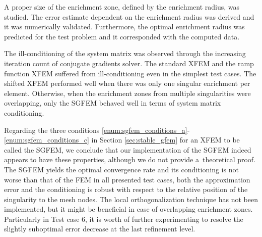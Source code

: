 A proper size of the enrichment zone, defined by the enrichment radius, was studied. The error estimate dependent
on the enrichment radius was derived and it was numerically validated. Furthermore, the optimal enrichment radius was predicted 
for the test problem and it corresponded with the computed data.

The ill-conditioning of the system matrix was observed through the increasing iteration count of conjugate gradients solver.
The standard XFEM and the ramp function XFEM suffered from ill-conditioning even in the simplest test cases.
The shifted XFEM performed well when there was only one singular enrichment per element. Otherwise, when the enrichment
zones from multiple singularities were overlapping, only the SGFEM behaved well in terms of system matrix conditioning.


Regarding the three conditions \ref{enum:sgfem_conditions_a}-\ref{enum:sgfem_conditions_c} in Section \ref{sec:stable_gfem}
for an XFEM to be called the SGFEM, we conclude that our implementation of the SGFEM indeed appears to have these properties,
although we do not provide a~theoretical proof. The SGFEM yields the optimal convergence rate and its conditioning is not worse
than that of the FEM in all presented test cases, both the approximation error and the conditioning is robust with respect to the relative position
of the singularity to the mesh nodes.
The local orthogonalization technique has not been implemented, but it might be beneficial in case of overlapping enrichment zones.
Particularly in Test case 6, it is worth of further experimenting to resolve the slightly suboptimal error decrease at the last refinement level.





